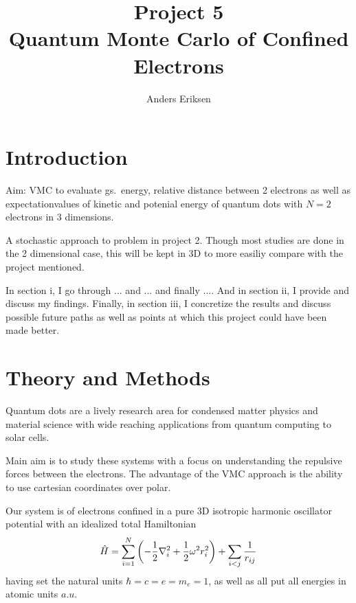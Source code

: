 \documentclass[10pt]{revtex4-1}
\begin{document}
\title{%
    Project 5\\
    \large
    Quantum Monte Carlo of Confined Electrons}
\author{Anders Eriksen}
\begin{abstract}
\end{abstract}
\maketitle

\section{Introduction}
Aim: VMC to evaluate gs.\  energy, relative distance between 2 electrons as well as expectationvalues of kinetic and potenial energy of quantum dots
with $N=2$ electrons in 3 dimensions.

A stochastic approach to problem in project 2. Though most studies are done in the 2 dimensional case, this will be kept in 3D to more easiliy
compare with the project mentioned.

In section i, I go through ... and ... and finally .... And in section ii, I provide and discuss my findings. Finally, in section iii, I concretize
the results and discuss possible future paths as well as points at which this project could have been made better.

\section{Theory and Methods}
Quantum dots are a lively research area for condensed matter physics and material science with wide reaching applications from quantum computing
to solar cells.

Main aim is to study these systems with a focus on understanding the repulsive forces between the electrons. The advantage of the VMC approach is the
ability to use cartesian coordinates over polar. %

Our system is of electrons confined in a pure 3D isotropic harmonic oscillator potential with an idealized total Hamiltonian
\begin{align}
    \hat{H} = \sum_{i = 1}^{N} \qty( - \frac{1}{2} \nabla_{i}^{2} + \frac{1}{2} \omega^{2} r_{i}^{2} ) + \sum_{i < j} \frac{1}{r_{i j}}\label{eq:full}
\end{align}
having set the natural units $\hbar = c = e = m_{e} = 1$, as well as all put all energies in atomic units $a.u$.
\end{document}
